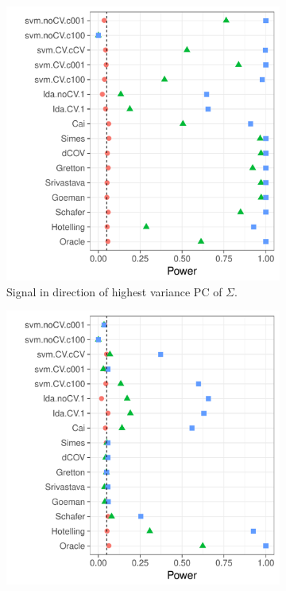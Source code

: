 \documentclass[]{bio}
\begin{document}
\begin{figure}[h]
	\centering
	\begin{subfigure}[t]{.45\columnwidth}
		\centering
		\includegraphics[width=1\columnwidth]{"art/file22"}
		\caption{Signal in direction of highest variance PC of $\Sigma$.} 
		\label{fig:dependence_21}
	\end{subfigure}
	\begin{subfigure}[t]{.45\columnwidth}
		\centering
		\includegraphics[width=1\columnwidth]{"art/file23"}

\end{subfigure}
\end{figure}
\end{document}
